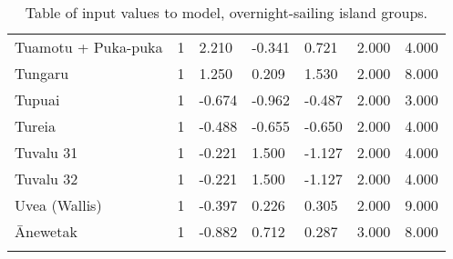 \begin{longtable}{p{4.5cm}p{1.4cm}p{1.4cm}p{1.4cm}p{1.4cm}p{1.7cm}p{1.7cm}}
  Tuamotu + Puka-puka & 1 & 2.210 & -0.341 & 0.721 & 2.000 & 4.000 \\ 
  Tungaru & 1 & 1.250 & 0.209 & 1.530 & 2.000 & 8.000 \\ 
  Tupuai & 1 & -0.674 & -0.962 & -0.487 & 2.000 & 3.000 \\ 
  Tureia & 1 & -0.488 & -0.655 & -0.650 & 2.000 & 4.000 \\ 
  Tuvalu 31 & 1 & -0.221 & 1.500 & -1.127 & 2.000 & 4.000 \\ 
  Tuvalu 32 & 1 & -0.221 & 1.500 & -1.127 & 2.000 & 4.000 \\ 
  Uvea (Wallis) & 1 & -0.397 & 0.226 & 0.305 & 2.000 & 9.000 \\ 
  Ānewetak & 1 & -0.882 & 0.712 & 0.287 & 3.000 & 8.000 \\ 
   \bottomrule
\caption{Table of input values to model, overnight-sailing island groups.} 
\label{appendix_SBZR_table}
\end{longtable}
